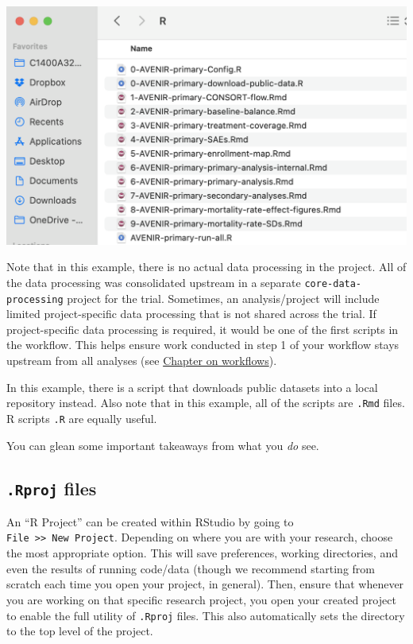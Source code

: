 \documentclass[
]{book}
\begin{document}
\includegraphics[width=0.75\linewidth]{images/mystudy-dir-fig5}

Note that in this example, there is no actual data processing in the project. All of the data processing was consolidated upstream in a separate \texttt{core-data-processing} project for the trial. Sometimes, an analysis/project will include limited project-specific data processing that is not shared across the trial. If project-specific data processing is required, it would be one of the first scripts in the workflow. This helps ensure work conducted in step 1 of your workflow stays upstream from all analyses (see \hyperref[workflows]{Chapter on workflows}).

In this example, there is a script that downloads public datasets into a local repository instead. Also note that in this example, all of the scripts are \texttt{.Rmd} files. R scripts \texttt{.R} are equally useful.

You can glean some important takeaways from what you \emph{do} see.

\subsection{\texorpdfstring{\texttt{.Rproj} files}{.Rproj files}}\label{rproj-files}

An ``R Project'' can be created within RStudio by going to \texttt{File\ \textgreater{}\textgreater{}\ New\ Project}. Depending on where you are with your research, choose the most appropriate option. This will save preferences, working directories, and even the results of running code/data (though we recommend starting from scratch each time you open your project, in general). Then, ensure that whenever you are working on that specific research project, you open your created project to enable the full utility of \texttt{.Rproj} files. This also automatically sets the directory to the top level of the project.
\end{document}
